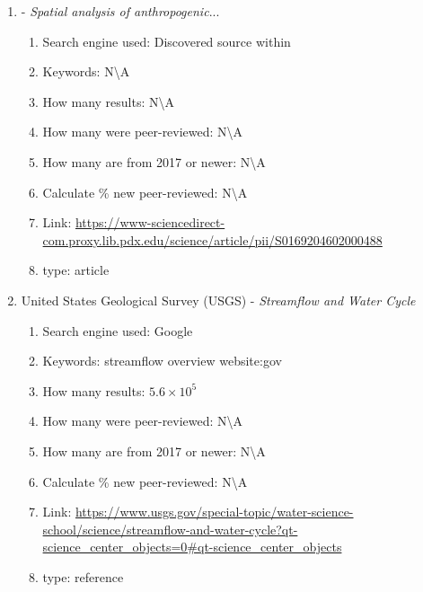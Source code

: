 \documentclass[a4paper,man,biblatex]{apa7}
\begin{document}
\begin{enumerate}
        
    \item \textcite{stein_2002} - \textit{Spatial analysis of anthropogenic}...
        \begin{enumerate}
            \item Search engine used: Discovered source within \textcite{falcone_2016}
            \item Keywords: N\textbackslash A 
            \item How many results: N\textbackslash A
            \item How many were peer-reviewed: N\textbackslash A
            \item How many are from 2017 or newer: N\textbackslash A
            \item Calculate \% new peer-reviewed: N\textbackslash A
            \item Link: \url{https://www-sciencedirect-com.proxy.lib.pdx.edu/science/article/pii/S0169204602000488}
            \item type: article 
        \end{enumerate}


    \item United States Geological Survey (USGS) - \textit{Streamflow and Water Cycle}
        \begin{enumerate}
            \item Search engine used: Google
            \item Keywords: streamflow overview website:gov 
            \item How many results: $5.6\times 10^5$
            \item How many were peer-reviewed: N\textbackslash A
            \item How many are from 2017 or newer: N\textbackslash A
            \item Calculate \% new peer-reviewed: N\textbackslash A 
            \item Link: \url{https://www.usgs.gov/special-topic/water-science-school/science/streamflow-and-water-cycle?qt-science_center_objects=0#qt-science_center_objects}
            \item type: reference 
        \end{enumerate}



\end{enumerate}
\end{document}
